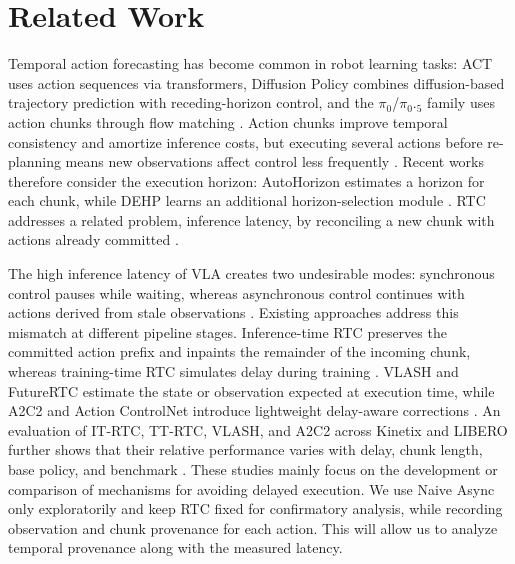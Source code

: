 \documentclass{article}
\begin{document}
\section{Related Work}

Temporal action forecasting has become common in robot learning tasks: ACT uses action sequences via transformers, Diffusion Policy combines diffusion-based trajectory prediction with receding-horizon control, and the $\pi_0$/$\pi_0._5$ family uses action chunks through flow matching \cite{1} \cite{8} \cite{9} \cite{10}. Action chunks improve temporal consistency and amortize inference costs, but executing several actions before re-planning means new observations affect control less frequently \cite{3}\cite{11}. Recent works therefore consider the execution horizon: AutoHorizon estimates a horizon for each chunk, while DEHP learns an additional horizon-selection module \cite{12}\cite{13}. RTC addresses a related problem, inference latency, by reconciling a new chunk with actions already committed \cite{3}.

The high inference latency of VLA creates two undesirable modes: synchronous control pauses while waiting, whereas asynchronous control continues with actions derived from stale observations \cite{3} \cite{14} \cite{11} \cite{15}. Existing approaches address this mismatch at different pipeline stages. Inference-time RTC preserves the committed action prefix and inpaints the remainder of the incoming chunk, whereas training-time RTC simulates delay during training \cite{3} \cite{16}. VLASH and FutureRTC estimate the state or observation expected at execution time, while A2C2 and Action ControlNet introduce lightweight delay-aware corrections \cite{11} \cite{14} \cite{15} \cite{17}. An evaluation of IT-RTC, TT-RTC, VLASH, and A2C2 across Kinetix and LIBERO further shows that their relative performance varies with delay, chunk length, base policy, and benchmark \cite{18}. These studies mainly focus on the development or comparison of mechanisms for avoiding delayed execution. We use Naive Async only exploratorily and keep RTC fixed for confirmatory analysis, while recording observation and chunk provenance for each action. This will allow us to analyze temporal provenance along with the measured latency.
\end{document}
